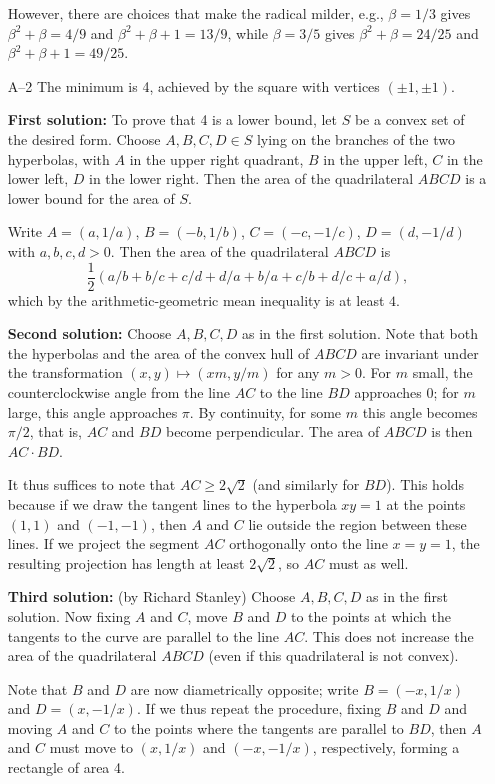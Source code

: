 \documentclass[amssymb,twocolumn,pra,10pt,aps]{revtex4-1}
\begin{document}
\begin{itemize}
However, there are choices that make the radical milder,
e.g., $\beta = 1/3$  gives
$\beta^2 + \beta = 4/9$ and $\beta^2 + \beta + 1 = 13/9$,
while $\beta = 3/5$ gives $\beta^2 + \beta = 24/25$
and $\beta^2 + \beta + 1 = 49/25$.

\item[A--2]
The minimum is 4, achieved by the square with vertices $(\pm 1, \pm 1)$.

\textbf{First solution:}
To prove that 4 is a lower bound, let $S$ be a convex set of the desired
form. Choose $A,B,C,D \in S$ lying on the branches of the two hyperbolas,
with $A$ in the upper right
quadrant, $B$ in the upper left, $C$ in the lower left, $D$ in the lower right.
Then the area of the quadrilateral $ABCD$ is a lower bound for
the area of $S$.

Write $A = (a,1/a)$,
$B = (-b,1/b)$, $C = (-c,-1/c)$, $D = (d, -1/d)$ with $a,b,c,d > 0$.
Then the area of the quadrilateral $ABCD$ is
\[
\frac{1}{2}(a/b + b/c + c/d + d/a + b/a + c/b + d/c + a/d),
\]
which by the arithmetic-geometric mean inequality is at least
$4$.

\textbf{Second solution:}
Choose $A,B,C,D$ as in the first solution.
Note that both the hyperbolas and the area of the convex hull of $ABCD$ are
invariant under the transformation $(x,y) \mapsto (xm, y/m)$ for any
$m>0$. For $m$ small, the counterclockwise angle from the line $AC$ to
the line $BD$ approaches 0; for $m$ large, this angle approaches $\pi$.
By continuity, for some $m$ this angle becomes $\pi/2$, that is,
$AC$ and $BD$ become perpendicular. The area of $ABCD$
is then $AC \cdot BD$.

It thus suffices to note that $AC \geq 2 \sqrt{2}$ (and similarly for $BD$).
This holds because if we draw the tangent lines to the hyperbola $xy=1$
at the points $(1,1)$ and $(-1,-1)$, then $A$ and $C$ lie outside the region
between these lines. If we project the segment $AC$ orthogonally
onto the line $x=y=1$, the resulting projection has length at
least $2 \sqrt{2}$,
so $AC$ must as well.

\textbf{Third solution:}
(by Richard Stanley)
Choose $A,B,C,D$ as in the first solution. Now fixing $A$ and $C$, move $B$ and
$D$ to the points at which the tangents to the curve are parallel to the line
$AC$. This does not increase the area of the quadrilateral $ABCD$ (even if
this quadrilateral is not convex).

Note that $B$ and $D$ are now diametrically opposite; write $B = (-x, 1/x)$
and $D = (x, -1/x)$. If we thus repeat the
procedure, fixing $B$ and $D$ and moving $A$ and $C$ to the points where the
tangents are parallel to $BD$, then $A$ and $C$ must move to $(x, 1/x)$
and $(-x,-1/x)$, respectively, forming a rectangle of area 4.


\end{itemize}
\end{document}
